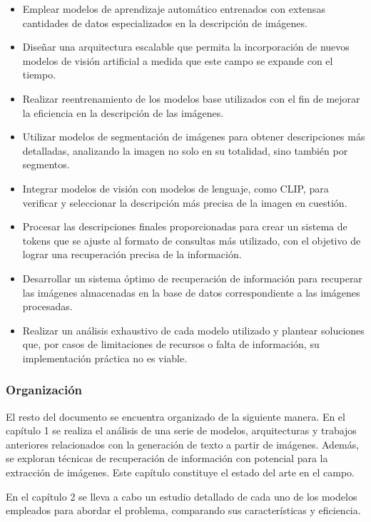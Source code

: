 \begin{itemize}
\item Emplear modelos de aprendizaje autom\'atico entrenados con extensas cantidades de datos especializados en la descripci\'on de im\'agenes.
\item Dise\~nar una arquitectura escalable que permita la incorporaci\'on de nuevos modelos de visi\'on artificial a medida que este campo se expande con el tiempo.
\item Realizar reentrenamiento de los modelos base utilizados con el fin de mejorar la eficiencia en la descripci\'on de las im\'agenes.
\item Utilizar modelos de segmentaci\'on de im\'agenes para obtener descripciones m\'as detalladas, analizando la imagen no solo en su totalidad, sino tambi\'en por segmentos.
\item Integrar modelos de visi\'on con modelos de lenguaje, como CLIP, para verificar y seleccionar la descripci\'on m\'as precisa de la imagen en cuesti\'on.
\item Procesar las descripciones finales proporcionadas para crear un sistema de tokens que se ajuste al formato de consultas m\'as utilizado, con el objetivo de lograr una recuperaci\'on precisa de la informaci\'on.
\item Desarrollar un sistema \'optimo de recuperaci\'on de informaci\'on para recuperar las im\'agenes almacenadas en la base de datos correspondiente a las im\'agenes procesadas.
\item Realizar un an\'alisis exhaustivo de cada modelo utilizado y plantear soluciones que, por casos de limitaciones de recursos o falta de informaci\'on, su implementaci\'on pr\'actica no es viable.
\end{itemize}


\subsubsection*{Organizaci\'on}
El resto del documento se encuentra organizado de la siguiente manera. En el cap\'itulo 1 se realiza el an\'alisis de una serie de modelos, arquitecturas y trabajos anteriores relacionados con la generaci\'on de texto a partir de im\'agenes. Adem\'as, se exploran t\'ecnicas de recuperaci\'on de informaci\'on con potencial para la extracci\'on de im\'agenes. Este cap\'itulo constituye el estado del arte en el campo.

En el cap\'itulo 2 se lleva a cabo un estudio detallado de cada uno de los modelos empleados para abordar el problema, comparando sus caracter\'isticas y eficiencia.

